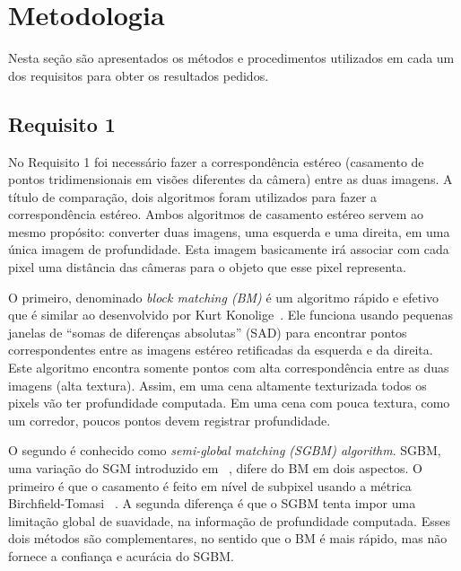 \documentclass{bmvc2k}
\begin{document}
\section{Metodologia}
\label{sec:Methods}
Nesta seção são apresentados os métodos e procedimentos utilizados em cada um dos requisitos para obter os resultados pedidos.
\subsection{Requisito 1}
\label{req1}
No Requisito 1 foi necessário fazer a correspondência estéreo (casamento de pontos tridimensionais em visões diferentes da câmera) entre as duas imagens. A título de comparação, dois algoritmos foram utilizados para fazer a correspondência estéreo. Ambos algoritmos de casamento estéreo servem ao mesmo propósito: converter duas imagens, uma esquerda e uma direita, em uma única imagem de profundidade. Esta imagem basicamente irá associar com cada pixel uma distância das câmeras para o objeto que esse pixel representa.  

O primeiro, denominado \textit{block matching (BM)} é um algoritmo rápido e efetivo que é similar ao desenvolvido por Kurt Konolige~\cite{kurt}. Ele funciona usando pequenas janelas de ``somas de diferenças absolutas'' (SAD) para encontrar pontos correspondentes entre as imagens estéreo retificadas da esquerda e da direita. Este algoritmo encontra somente pontos com alta correspondência entre as duas imagens (alta textura). Assim, em uma cena altamente texturizada todos os pixels vão ter profundidade computada. Em uma cena com pouca textura, como um corredor, poucos pontos devem registrar profundidade. 

O segundo é conhecido como \textit{semi-global matching (SGBM) algorithm}. SGBM, uma variação do SGM introduzido em ~\cite{hirschmullerstereo}, difere do BM em dois aspectos. O primeiro é que o casamento é feito em nível de subpixel usando a métrica Birchfield-Tomasi ~\cite{birchfield1999depth}. A segunda diferença é que o SGBM tenta impor uma limitação global de suavidade, na informação de profundidade computada. Esses dois métodos são complementares, no sentido que o BM é mais rápido, mas não fornece a confiança e acurácia do SGBM.
\end{document}
